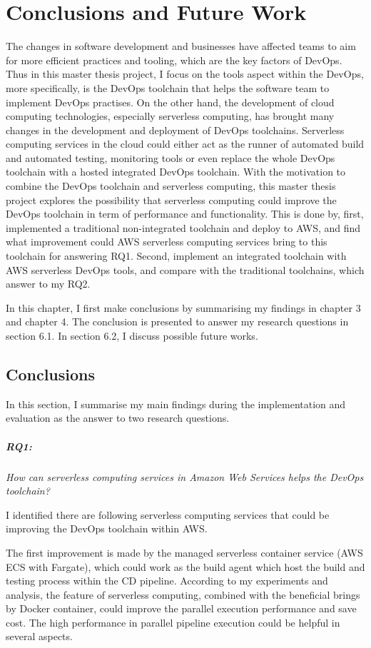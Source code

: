 \chapter{Conclusions and Future Work}
\label{chp:conclusionsandfuturework}
The changes in software development and businesses have affected teams to aim for more efficient practices and tooling, which are the key factors of DevOps. Thus in this master thesis project, I focus on the tools aspect within the DevOps, more specifically, is the DevOps toolchain that helps the software team to implement DevOps practises. On the other hand, the development of cloud computing technologies, especially serverless computing, has brought many changes in the development and deployment of DevOps toolchains. Serverless computing services in the cloud could either act as the runner of automated build and automated testing, monitoring tools or even replace the whole DevOps toolchain with a hosted integrated DevOps toolchain. With the motivation to combine the DevOps toolchain and serverless computing, this master thesis project explores the possibility that serverless computing could improve the DevOps toolchain in term of performance and functionality. 
This is done by, first, implemented a traditional non-integrated toolchain and deploy to AWS, and find what improvement could AWS serverless computing services bring to this toolchain for answering RQ1. Second, implement an integrated toolchain with AWS serverless DevOps tools, and compare with the traditional toolchains, which answer to my RQ2. 

In this chapter, I first make conclusions by summarising my findings in chapter 3 and chapter 4. The conclusion is presented to answer my research questions in section 6.1. In section 6.2, I discuss possible future works.
\section{Conclusions}
In this section, I summarise my main findings during the implementation and evaluation as the answer to two research questions.
\paragraph{RQ1:} \textit{How can serverless computing services in Amazon Web Services helps the DevOps toolchain?}
\medskip
\par
I identified there are following serverless computing services that could be improving the DevOps toolchain within AWS.
\par
The first improvement is made by the managed serverless container service (AWS ECS with Fargate), which could work as the build agent which host the build and testing process within the CD pipeline. According to my experiments and analysis, the feature of serverless computing, combined with the beneficial brings by Docker container, could improve the parallel execution performance and save cost. The high performance in parallel pipeline execution could be helpful in several aspects. 


